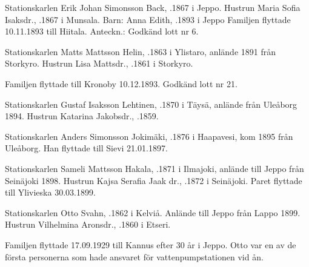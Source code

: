 {Stationskarlen Erik Johan Simonsson Back, .1867 i Jeppo. Hustrun Maria Sofia Isaksdr., .1867 i Munsala.
Barn: Anna Edith, .1893 i Jeppo
Familjen flyttade 10.11.1893 till Hiitala. Anteckn.: Godkänd lott nr 6.


Stationskarlen Matts Mattsson Helin, .1863 i Ylistaro, anlände 1891 från Storkyro. Hustrun Lisa Mattsdr., .1861 i Storkyro.
\begin{jhchildren}
  \item {}
  \item {}
\end{jhchildren}
Familjen flyttade till Kronoby 10.12.1893. Godkänd lott nr 21.


Stationskarlen Gustaf Isaksson Lehtinen, .1870 i Täysä, anlände från Uleåborg 1894. Hustrun Katarina Jakobsdr., .1859.
\begin{jhchildren}
  \item {}
  \item {}
\end{jhchildren}


Stationskarlen Anders Simonsson Jokimäki, .1876 i Haapavesi, kom 1895 från Uleåborg. Han flyttade till Sievi 21.01.1897.


Stationskarlen Sameli Mattsson Hakala, .1871 i Ilmajoki, anlände till Jeppo från Seinäjoki 1898. Hustrun Kajsa Serafia Jaak dr., .1872 i Seinäjoki. Paret flyttade till Ylivieska 30.03.1899.


Stationskarlen Otto Svahn, .1862 i Kelviå. Anlände till Jeppo från Lappo 1899. Hustrun Vilhelmina Aronsdr., .1860 i Etseri.
\begin{jhchildren}
  \item {}
  \item {}
  \item {}
  \item {}
  \item {}
  \item {}
  \item {}
  \item {}
  \item {}
  \item {}
  \item {}
\end{jhchildren}
Familjen flyttade 17.09.1929 till Kannus efter 30 år i Jeppo. Otto var en av de första personerna som hade ansvaret för vattenpumpstationen vid ån.


}

